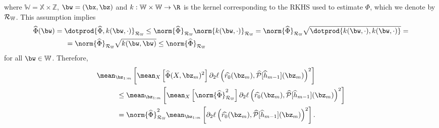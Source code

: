where $ \mathbb{W} = \mathbb{X} \times \mathbb{Z} $, $ \bw = ( \bx, \bz ) $ and $ k : \mathbb{W} \times \mathbb{W} \to \R $ is the kernel corresponding to the RKHS used to estimate $ \Phi $, which we denote by $ \mathcal{R}_{ \mathbb{W} } $.
This assumption implies
\begin{align*}
    &\hat{ \Phi } ( \bw )
    = \dotprod{ \hat{ \Phi }, k ( \bw, \cdot ) }_{ \rkhsw }
    \leq \norm{ \hat{ \Phi } }_{ \rkhsw } \norm{ k ( \bw, \cdot ) }_{ \rkhsw }
    = \norm{ \hat{ \Phi } }_{ \rkhsw } \sqrt{ \dotprod{ k ( \bw, \cdot ), k ( \bw, \cdot ) } } = \\
    &\hspace{1.6cm}
    = \norm{ \hat{ \Phi } }_{ \rkhsw } \sqrt{ k ( \bw, \bw ) }
    \leq \norm{ \hat{ \Phi } }_{ \rkhsw }
\end{align*}
for all $ \bw \in \mathbb{W} $.
Therefore,
\begin{align*}
    &\mean_{ \bz_{ 1:m } } \left[
        \mean_{ X } \left[
            \hat{ \Phi } ( X, \bz_{ m } )^2
        \right]
        \partial_{ 2 } \ell \left(
            \hat{ r_{ 0 } } ( \bz_{ m } ),
            \hat{ \meanop } [ \hat{ h }_{ m-1 } ] ( \bz_{ m } )
        \right)^2
    \right] \\
    &\hspace{1cm}\leq
    \mean_{ \bz_{ 1:m } } \left[
        \mean_{ X } \left[
            \norm{ \hat{ \Phi } }_{ \rkhsw }^2
        \right]
        \partial_{ 2 } \ell \left(
            \hat{ r_{ 0 } } ( \bz_{ m } ),
            \hat{ \meanop } [ \hat{ h }_{ m-1 } ] ( \bz_{ m } )
        \right)^2
    \right] \\
    &\hspace{1cm}=
    \norm{ \hat{ \Phi } }_{ \rkhsw }^2
    \mean_{ \bz_{ 1:m } } \left[
        \partial_{ 2 } \ell \left(
            \hat{ r_{ 0 } } ( \bz_{ m } ),
            \hat{ \meanop } [ \hat{ h }_{ m-1 } ] ( \bz_{ m } )
        \right)^2
    \right]
.\end{align*}

